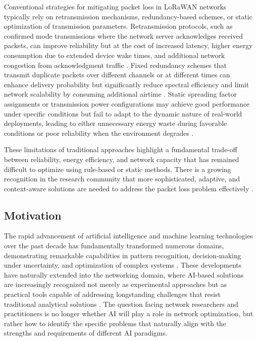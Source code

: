 \documentclass[12pt,a4paper]{article}
\begin{document}
Conventional strategies for mitigating packet loss in LoRaWAN networks typically rely on retransmission mechanisms, redundancy-based schemes, or static optimization of transmission parameters. Retransmission protocols, such as confirmed mode transmissions where the network server acknowledges received packets, can improve reliability but at the cost of increased latency, higher energy consumption due to extended device wake times, and additional network congestion from acknowledgment traffic \cite{petajajarvi2017evaluation}. Fixed redundancy schemes that transmit duplicate packets over different channels or at different times can enhance delivery probability but significantly reduce spectral efficiency and limit network scalability by consuming additional airtime \cite{khaled2020lorawan}. Static spreading factor assignments or transmission power configurations may achieve good performance under specific conditions but fail to adapt to the dynamic nature of real-world deployments, leading to either unnecessary energy waste during favorable conditions or poor reliability when the environment degrades \cite{reynders2017improving}.

These limitations of traditional approaches highlight a fundamental trade-off between reliability, energy efficiency, and network capacity that has remained difficult to optimize using rule-based or static methods. There is a growing recognition in the research community that more sophisticated, adaptive, and context-aware solutions are needed to address the packet loss problem effectively \cite{haxhibeqiri2018survey}.

\subsection{Motivation}
\label{subsec:motivation}

The rapid advancement of artificial intelligence and machine learning technologies over the past decade has fundamentally transformed numerous domains, demonstrating remarkable capabilities in pattern recognition, decision-making under uncertainty, and optimization of complex systems \cite{lecun2015deep}. These developments have naturally extended into the networking domain, where AI-based solutions are increasingly recognized not merely as experimental approaches but as practical tools capable of addressing longstanding challenges that resist traditional analytical solutions \cite{fadlullah2017state}. The question facing network researchers and practitioners is no longer whether AI will play a role in network optimization, but rather how to identify the specific problems that naturally align with the strengths and requirements of different AI paradigms.
\end{document}
